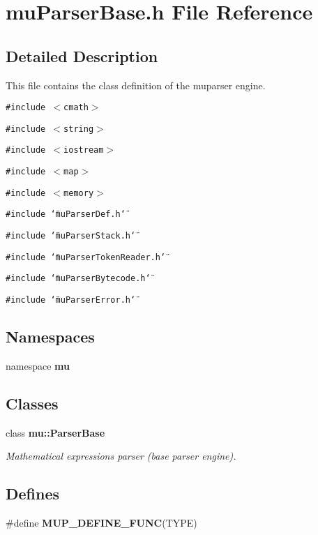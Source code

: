 \section{muParserBase.h File Reference}
\label{muParserBase_8h}


\subsection{Detailed Description}
This file contains the class definition of the muparser engine. 



{\tt \#include $<$cmath$>$}\par
{\tt \#include $<$string$>$}\par
{\tt \#include $<$iostream$>$}\par
{\tt \#include $<$map$>$}\par
{\tt \#include $<$memory$>$}\par
{\tt \#include \char`\"{}muParserDef.h\char`\"{}}\par
{\tt \#include \char`\"{}muParserStack.h\char`\"{}}\par
{\tt \#include \char`\"{}muParserTokenReader.h\char`\"{}}\par
{\tt \#include \char`\"{}muParserBytecode.h\char`\"{}}\par
{\tt \#include \char`\"{}muParserError.h\char`\"{}}\par
\subsection*{Namespaces}
\begin{CompactItemize}
\item 
namespace {\bf mu}
\end{CompactItemize}
\subsection*{Classes}
\begin{CompactItemize}
\item 
class {\bf mu::ParserBase}
\begin{CompactList}\small\item\em Mathematical expressions parser (base parser engine). \item\end{CompactList}\end{CompactItemize}
\subsection*{Defines}
\begin{CompactItemize}
\item 
\#define {\bf MUP\_\-DEFINE\_\-FUNC}(TYPE)
\end{CompactItemize}


